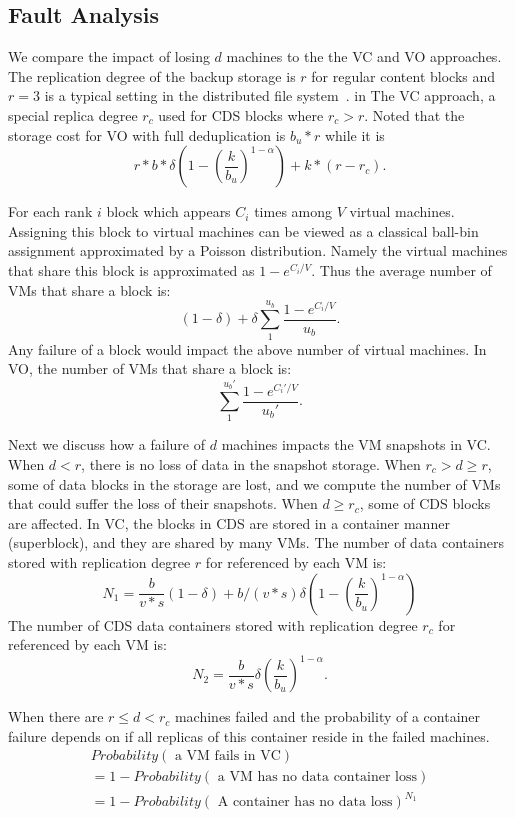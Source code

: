 \subsection{Fault Analysis }

We  compare the impact of losing $d$ machines 
to the the VC and VO approaches.  
The replication degree of the backup storage 
is $r$ for regular content blocks and $r=3$ is a typical setting in the distributed
file system~\cite{Hadoop,GFS}.
in The VC approach, a special replica degree $r_c$ used for CDS blocks where $r_c>r$. 
Noted that the storage cost for VO with full deduplication is $b_u *r$
while it is
\[ r*b*\delta(1 -   (\frac{k}{b_u})^{1-\alpha}) +k*(r-r_c).
\]

For each rank $i$ block which appears $C_i$ times  among $V$ virtual machines.
Assigning this block to virtual machines can be viewed as a classical ball-bin assignment
approximated by a Poisson distribution. Namely the virtual machines that share this block
is approximated as $1 -  e^{C_i/V}$.
Thus the average number of VMs that share a block is:
\[
(1-\delta) + \delta \sum_1^{u_b} \frac{1 -  e^{C_i/V}}{u_b}.
\]
Any failure of a block would impact the above number of virtual machines.
In VO, the number of VMs that share a block is:
\[
\sum_1^{u_b'} \frac{1 -  e^{C_i'/V}}{u_b'}.
\]

Next we discuss how a failure of $d$ machines impacts the VM snapshots in VC.
When $d<r$, there is no loss of data in the snapshot storage.
When $r_c> d \ge r$, some of data blocks in the storage are lost, and we compute the number of VMs that could
suffer the loss of their snapshots.
When $d \ge r_c$, some of CDS blocks are affected.
In VC, the blocks in CDS are stored in a container manner (superblock), and they are shared by many VMs.
The number of data containers stored with replication degree $r$ for
referenced by each VM is:
\[
N_1= \frac{b}{v*s} (1-\delta) +b/(v*s)\delta (1 -  (\frac{k}{b_u})^{1-\alpha})
\]
The number of CDS data containers stored with replication degree $r_c$ for
referenced by each VM is:
\[
N_2= \frac{b}{v*s}\delta (\frac{k}{b_u})^{1-\alpha}.
\]




When there are $r \le d<r_c$ machines failed and the probability of
a container failure depends on if all replicas of this container reside in the failed machines.
\begin{multline}
Probability (\mbox{ a VM fails in VC})\\
= 1- Probability (\mbox{ a VM has no data container loss}) \\
= 1-  Probability(\mbox{ A container has no data loss})^{N_1}
\end{multline}

